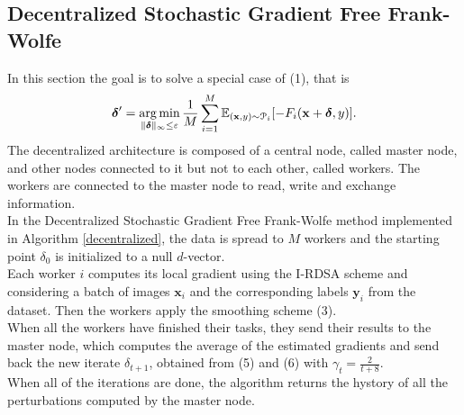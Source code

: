\subsection{Decentralized Stochastic Gradient Free Frank-Wolfe}
In this section the goal is to solve a special case of (1), that is
\begin{equation}
	\mbox{\boldmath$ \delta$}' = \operatorname*{arg\,min}_{\lVert \mbox{\boldmath$\scriptstyle \delta$}\rVert_{\infty}\leq\varepsilon} \frac{1}{M}\sum_{i=1}^M \mathbb{E}_{(\mathbf{x},y)\sim \mathcal{P}_i}[- F_i(\mathbf{x}+\mbox{\boldmath$ \delta$},y)].
\end{equation}
The decentralized architecture is composed of a central node, called master node, and other nodes connected to it but not to each other, called workers.
The workers are connected to the master node to read, write and exchange information.\\
\indent In the Decentralized Stochastic Gradient Free Frank-Wolfe method implemented in Algorithm \ref{decentralized}, the data is spread to $M$ workers and the starting point \mbox{\boldmath$ \delta$}$_{0}$ is initialized to a null $d$-vector.\\
\indent Each worker $i$ computes its local gradient using the I-RDSA scheme and considering a batch of images $\mathbf{x}_i$ and the corresponding labels $\mathbf{y}_i$ from the dataset. Then the workers apply the smoothing scheme (3).\\
\indent When all the workers have finished their tasks, they send their results to the master node, which computes the average of the estimated gradients and send back the new iterate \mbox{\boldmath$ \delta$}$_{t+1}$, obtained from (5) and (6) with $\gamma_t = \frac{2}{t+8}$.\\
\indent When all of the iterations are done, the algorithm returns the hystory of all the perturbations computed by the master node.

